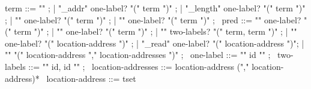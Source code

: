 \begin{syntax}
  term ::= "\null" ;
        | "\base_addr" { one-label? } "(" term ")" ;
        | "\block_length" { one-label? } "(" term ")" ;
        | { "\offset" one-label? }  "(" term ")" ;
        | { "\allocation" one-label? }  "(" term ")" ;
       \
  pred ::=  { "\allocable" one-label? }"(" term ")" ;
       |  { "\freeable" one-label? }"(" term ")" ;
       |  { "\fresh"  two-labels? }"(" term, term ")" ;
       | "\valid" { one-label? } "(" location-address ")" ;
       |  { "\valid_read" one-label?} "(" location-address ")";
       |  "\separated" "(" location-address "," location-addresses ")" ;
       \
  one-label ::= "{" id "}" ;
       \
  two-labels ::= "{" id, id "}" ;
       \
  location-addresses ::= location-address ("," location-address)*
  \
  location-address ::= tset
\end{syntax}

